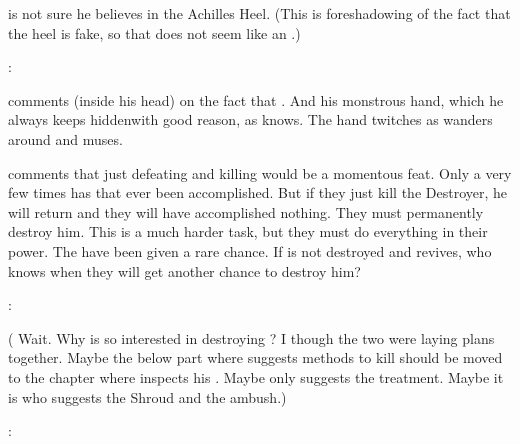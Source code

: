 \Azraid{} is not sure he believes in the Achilles Heel. 
(This is foreshadowing of the fact that the heel is fake, so that does not seem like an .) 

\Azraid: 

\Teshrial{} comments (inside his head) on the fact that . 
And his monstrous hand, which he always keeps hidden\dash with good reason, as \Teshrial{} knows. 
The hand twitches as \Azraid wanders around and muses. 


\Azraid comments that just defeating and killing \Ishnaruchaefir would be a momentous feat.
Only a very few times has that ever been accomplished. 
But if they just kill the Destroyer, he will return and they will have accomplished nothing. 
They must permanently destroy him.
This is a much harder task, but they must do everything in their power. 
The \resphain have been given a rare chance.
If \Ishnaruchaefir is not destroyed and revives, who knows when they will get another chance to destroy him?

\Teshrial: 



\begin{comment}
  \subsection{Azraid gives suggestions}
\end{comment}

(%
  Wait. 
  Why is \Azraid so interested in destroying \Ishnaruchaefir? 
  I though the two were laying plans together.
  Maybe the below part where \Azraid suggests methods to kill \Ishnaruchaefir should be moved to the chapter where \Teshrial inspects his \noggyaleth.
  Maybe \Azraid only suggests the \neoresphan treatment.
  Maybe it is \Urizeth who suggests the Shroud and the \noggyal ambush.)

\Azraid: 


